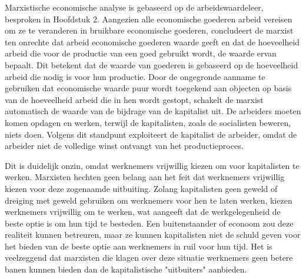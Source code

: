 Marxistische economische analyse is gebaseerd op de arbeidswaardeleer,
besproken in Hoofdstuk 2. Aangezien alle economische goederen arbeid
vereisen om ze te veranderen in bruikbare economische goederen,
concludeert de marxist ten onrechte dat arbeid economische goederen
waarde geeft en dat de hoeveelheid arbeid die voor de productie van een
goed gebruikt wordt, de waarde ervan bepaalt. Dit betekent dat de waarde
van goederen is gebaseerd op de hoeveelheid arbeid die nodig is voor hun
productie. Door de ongegronde aanname te gebruiken dat economische
waarde puur wordt toegekend aan objecten op basis van de hoeveelheid
arbeid die in hen wordt gestopt, schakelt de marxist automatisch de
waarde van de bijdrage van de kapitalist uit. De arbeiders moeten komen
opdagen en werken, terwijl de kapitalisten, zoals de socialisten
beweren, niets doen. Volgens dit standpunt exploiteert de kapitalist de
arbeider, omdat de arbeider niet de volledige winst ontvangt van het
productieproces.

Dit is duidelijk onzin, omdat werknemers vrijwillig kiezen om voor
kapitalisten te werken. Marxisten hechten geen belang aan het feit dat
werknemers vrijwillig kiezen voor deze zogenaamde uitbuiting. Zolang
kapitalisten geen geweld of dreiging met geweld gebruiken om werknemers
voor hen te laten werken, kiezen werknemers vrijwillig om te werken, wat
aangeeft dat de werkgelegenheid de beste optie is om hun tijd te
besteden. Een buitenstaander of econoom zou deze realiteit kunnen
betreuren, maar ze kunnen kapitalisten niet de schuld geven voor het
bieden van de beste optie aan werknemers in ruil voor hun tijd. Het is
veelzeggend dat marxisten die klagen over deze situatie werknemers geen
betere banen kunnen bieden dan de kapitalistische "uitbuiters"
aanbieden.

